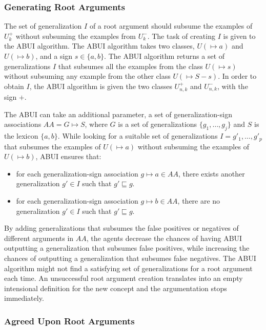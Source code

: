\subsubsection{Generating Root Arguments}

The set of generalization $I$ of a root argument should subsume the examples of $U^{+}_{k}$ without subsuming the examples from $U^{-}_{k}$. The task of creating $I$ is given to the ABUI algorithm. The ABUI algorithm takes two classes, $U(\mapsto a)$ and $U(\mapsto b)$, and a sign $s \in \{a, b\}$. The ABUI algorithm returns a set of generalizations $I$ that subsumes all the examples from the class $U(\mapsto s)$ without subsuming any example from the other class $U(\mapsto S-s)$. In order to obtain $I$, the ABUI algorithm is given the two classes $U^{+}_{n,k}$ and $U^{-}_{n,k}$, with the sign $+$.

The ABUI can take an additional parameter, a set of generalization-sign associations $AA = G \mapsto S$, where $G$ is a set of generalizations $\{g_{1}, \ldots, g_{j} \}$ and $S$ is the lexicon $\{ a, b \}$. While looking for a suitable set of generalizations $I = g'_{1}, \ldots, g'_{p} $ that subsumes the examples of $U(\mapsto a)$ without subsuming the examples of $U(\mapsto b)$, ABUI ensures that:

\begin{itemize}
    \item for each generalization-sign association $g \mapsto a \in AA$, there exists another generalization $g' \in I$ such that $g' \sqsubseteq g$.
    \item for each generalization-sign association $g \mapsto b \in AA$, there are no generalization $g' \in I$ such that  $g' \sqsubseteq g$.
\end{itemize}

By adding generalizations that subsumes the false positives or negatives of different arguments in $AA$, the agents decrease the chances of having ABUI outputting a generalization that subsumes false positives, while increasing the chances of outputting a generalization that subsumes false negatives. The ABUI algorithm might not find a satisfying set of generalizations for a root argument each time. An unsuccessful root argument creation translates into an empty intensional definition for the new concept and the argumentation stops immediately.

\subsubsection{Agreed Upon Root Arguments}

